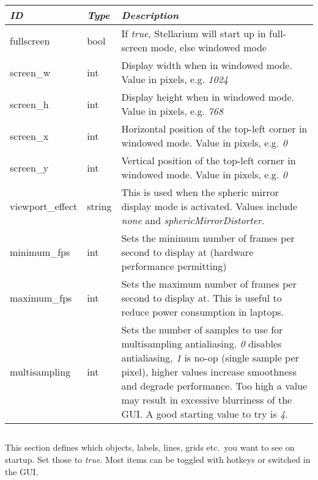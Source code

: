 \begin{tabularx}{\textwidth}{l|l|X}\toprule
\emph{ID}  & \emph{Type} & \emph{Description}\\\midrule
fullscreen       & bool   & If \emph{true}, Stellarium will start up in full-screen mode, else windowed mode\\%
screen\_w        & int    & Display width when in windowed mode. Value in pixels, e.g. \emph{1024}\\%
screen\_h        & int    & Display height when in windowed mode. Value in pixels, e.g. \emph{768}\\%
screen\_x        & int    & Horizontal position of the top-left corner in windowed mode. Value in pixels, e.g. \emph{0}\\%
screen\_y        & int    & Vertical   position of the top-left corner in windowed mode. Value in pixels, e.g. \emph{0}\\%
viewport\_effect & string & This is used when the spheric mirror display mode is activated. Values include \emph{none} and \emph{sphericMirrorDistorter}.\\%
minimum\_fps     & int    & Sets the minimum number of frames per second to display at (hardware performance permitting)\\%
maximum\_fps     & int    & Sets the maximum number of frames per second to display at. This is useful to reduce power consumption in laptops.\\%
multisampling    & int    & Sets the number of samples to use for multisampling antialiasing. \emph{0} disables antialiasing, \emph{1} is no-op (single sample per pixel), higher values increase smoothness and degrade performance. Too high a value may result in excessive blurriness of the GUI. A good starting value to try is \emph{4}.\\\bottomrule
\end{tabularx}

\subsection{}

This section defines which objects, labels, lines, grids etc.\ you
want to see on startup. Set those to \emph{true}. Most items can be
toggled with hotkeys or switched in the GUI.

